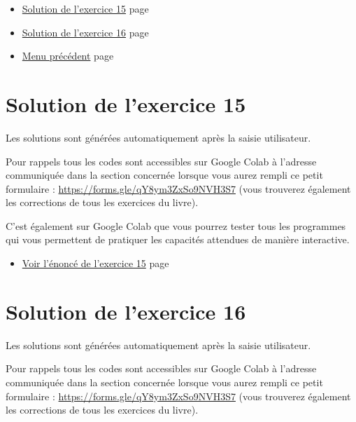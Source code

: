 \documentclass[a4paper,11pt]{book}
\begin{document}
\clearpage

\label{org58d9008}
\label{page:sols-capacity3-menu}
\begin{itemize}
\item \hyperref[orgb7308e1]{Solution de l'exercice 15}
page~\pageref{page:sec9.3.1-sol15}
\item \hyperref[org2f710b4]{Solution de l'exercice 16}
page~\pageref{page:sec9.3.2sol16}
\item \hyperref[orgcabe6f1]{Menu précédent}
page~\pageref{page:sols-capacities-menu}
\end{itemize}

\clearpage

\section{Solution de l'exercice 15}
\label{sec:org6009dd6}
\label{orgb7308e1}
\label{page:sec9.3.1-sol15}

Les solutions sont générées automatiquement après la saisie
utilisateur.

Pour rappels tous les codes sont accessibles sur Google Colab à
l'adresse communiquée dans la section concernée lorsque vous
aurez rempli ce petit formulaire : \url{https://forms.gle/qY8ym3ZxSo9NVH3S7}
(vous trouverez également les corrections de tous les exercices du
livre).

C'est également sur Google Colab que vous pourrez tester tous les
programmes qui vous permettent de pratiquer les capacités attendues
de manière interactive.

\begin{itemize}
\item \hyperref[org8cc10b8]{Voir l'énoncé de l'exercice 15}
page~\pageref{page:sec3.4.1exo15}
\end{itemize}



\clearpage

\section{Solution de l'exercice 16}
\label{sec:orgefbe07e}

\label{org2f710b4}
\label{page:sec9.3.2sol16}

Les solutions sont générées automatiquement après la saisie
utilisateur.

Pour rappels tous les codes sont accessibles sur Google Colab à
l'adresse communiquée dans la section concernée lorsque vous
aurez rempli ce petit formulaire : \url{https://forms.gle/qY8ym3ZxSo9NVH3S7}
(vous trouverez également les corrections de tous les exercices du
livre).
\end{document}
